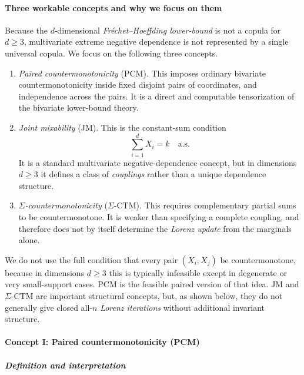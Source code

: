 \documentclass[onecolumn]{article}
\begin{document}
\paragraph{Three workable concepts and why we focus on them}

Because the $d$-dimensional \textit{Fr\'{e}chet--Hoeffding lower-bound} is
not a copula for $d\geq 3$, multivariate extreme negative dependence is not
represented by a single universal copula. We focus on the following three
concepts.

\begin{enumerate}
\item \emph{Paired countermonotonicity} (PCM). This imposes ordinary
bivariate countermonotonicity inside fixed disjoint pairs of coordinates,
and independence across the pairs. It is a direct and computable
tensorization of the bivariate lower-bound theory.

\item \emph{Joint mixability} (JM). This is the constant-sum condition 
\begin{equation*}
\sum_{i=1}^{d}X_{i}=k\quad \text{a.s.}
\end{equation*}%
It is a standard multivariate negative-dependence concept, but in dimensions 
$d\geq 3$ it defines a class of \textit{couplings} rather than a unique
dependence structure.

\item \emph{$\Sigma $-countermonotonicity} ($\Sigma $-CTM). This requires
complementary partial sums to be countermonotone. It is weaker than
specifying a complete coupling, and therefore does not by itself determine
the \textit{Lorenz update} from the marginals alone.
\end{enumerate}

We do not use the full condition that every pair $(X_{i},X_{j})$ be
countermonotone, because in dimensions $d\geq 3$ this is typically
infeasible except in degenerate or very small-support cases. PCM is the
feasible paired version of that idea. JM and $\Sigma $-CTM are important
structural concepts, but, as shown below, they do not generally give closed
all-$n$ \textit{Lorenz iterations} without additional invariant structure.

\paragraph{Concept I: Paired countermonotonicity (PCM)}

\subparagraph{Definition and interpretation}
\end{document}
